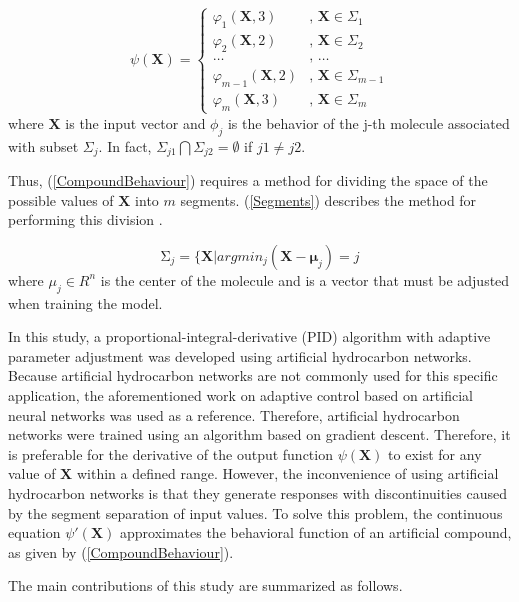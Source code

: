 \documentclass{ieeeaccess}
\begin{document}
\begin{equation}\label{CompoundBehaviour}
 \psi(\mathbf{X}) =
 \begin{cases}
 \varphi_1(\mathbf{X},3) &,\, \mathbf{X}\in\Sigma_1\\
 \varphi_2(\mathbf{X},2) &,\, \mathbf{X}\in\Sigma_2\\
 \ldots &,\, \ldots\\
 \varphi_{m-1}(\mathbf{X},2) &,\, \mathbf{X}\in\Sigma_{m-1}\\
 \varphi_{m}(\mathbf{X},3) &,\, \mathbf{X}\in\Sigma_{m}
 \end{cases}
\end{equation}
where \(\mathbf{X}\) is the input vector and \(\phi_j\) is the behavior of the j-th molecule associated with subset \(\Sigma_j\). In fact, \(\Sigma_{j1}\bigcap\Sigma_{j2}=\emptyset\) if \(j1\neq j2\).

Thus, (\ref{CompoundBehaviour}) requires a method for dividing the space of the possible values of \(\mathbf{X}\) into \(m\) segments. (\ref{Segments}) describes the method for performing this division \cite{ponce_comparative_2020}.

\begin{equation}\label{Segments}
 \mathrm{\Sigma}_j=\{\mathbf{X}\vert arg{min}_j(\mathbf{X}-\mathbf{\mu}_j)=j
\end{equation}
where \(\mu_j\in R^n\) is the center of the molecule and is a vector that must be adjusted when training the model.

In this study, a proportional-integral-derivative (PID) algorithm with adaptive parameter adjustment was developed using artificial hydrocarbon networks. Because artificial hydrocarbon networks are not commonly used for this specific application, the aforementioned work on adaptive control based on artificial neural networks was used as a reference. Therefore, artificial hydrocarbon networks were trained using an algorithm based on gradient descent. Therefore, it is preferable for the derivative of the output function \(\psi\left(\mathbf{X}\right)\) to exist for any value of \(\mathbf{X}\) within a defined range. However, the inconvenience of using artificial hydrocarbon networks is that they generate responses with discontinuities caused by the segment separation of input values. To solve this problem, the continuous equation \(\psi\prime\left(\mathbf{X}\right)\) approximates the behavioral function of an artificial compound, as given by (\ref{CompoundBehaviour}).

The main contributions of this study are summarized as follows.
\end{document}
